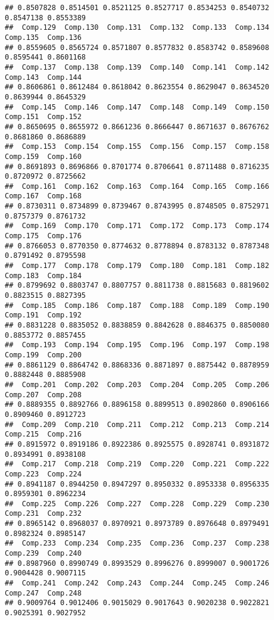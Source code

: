 \documentclass[
]{article}
\begin{document}
\begin{verbatim}
## 0.8507828 0.8514501 0.8521125 0.8527717 0.8534253 0.8540732 0.8547138 0.8553389 
##  Comp.129  Comp.130  Comp.131  Comp.132  Comp.133  Comp.134  Comp.135  Comp.136 
## 0.8559605 0.8565724 0.8571807 0.8577832 0.8583742 0.8589608 0.8595441 0.8601168 
##  Comp.137  Comp.138  Comp.139  Comp.140  Comp.141  Comp.142  Comp.143  Comp.144 
## 0.8606861 0.8612484 0.8618042 0.8623554 0.8629047 0.8634520 0.8639944 0.8645329 
##  Comp.145  Comp.146  Comp.147  Comp.148  Comp.149  Comp.150  Comp.151  Comp.152 
## 0.8650695 0.8655972 0.8661236 0.8666447 0.8671637 0.8676762 0.8681860 0.8686889 
##  Comp.153  Comp.154  Comp.155  Comp.156  Comp.157  Comp.158  Comp.159  Comp.160 
## 0.8691893 0.8696866 0.8701774 0.8706641 0.8711488 0.8716235 0.8720972 0.8725662 
##  Comp.161  Comp.162  Comp.163  Comp.164  Comp.165  Comp.166  Comp.167  Comp.168 
## 0.8730311 0.8734899 0.8739467 0.8743995 0.8748505 0.8752971 0.8757379 0.8761732 
##  Comp.169  Comp.170  Comp.171  Comp.172  Comp.173  Comp.174  Comp.175  Comp.176 
## 0.8766053 0.8770350 0.8774632 0.8778894 0.8783132 0.8787348 0.8791492 0.8795598 
##  Comp.177  Comp.178  Comp.179  Comp.180  Comp.181  Comp.182  Comp.183  Comp.184 
## 0.8799692 0.8803747 0.8807757 0.8811738 0.8815683 0.8819602 0.8823515 0.8827395 
##  Comp.185  Comp.186  Comp.187  Comp.188  Comp.189  Comp.190  Comp.191  Comp.192 
## 0.8831228 0.8835052 0.8838859 0.8842628 0.8846375 0.8850080 0.8853772 0.8857455 
##  Comp.193  Comp.194  Comp.195  Comp.196  Comp.197  Comp.198  Comp.199  Comp.200 
## 0.8861129 0.8864742 0.8868336 0.8871897 0.8875442 0.8878959 0.8882448 0.8885908 
##  Comp.201  Comp.202  Comp.203  Comp.204  Comp.205  Comp.206  Comp.207  Comp.208 
## 0.8889355 0.8892766 0.8896158 0.8899513 0.8902860 0.8906166 0.8909460 0.8912723 
##  Comp.209  Comp.210  Comp.211  Comp.212  Comp.213  Comp.214  Comp.215  Comp.216 
## 0.8915972 0.8919186 0.8922386 0.8925575 0.8928741 0.8931872 0.8934991 0.8938108 
##  Comp.217  Comp.218  Comp.219  Comp.220  Comp.221  Comp.222  Comp.223  Comp.224 
## 0.8941187 0.8944250 0.8947297 0.8950332 0.8953338 0.8956335 0.8959301 0.8962234 
##  Comp.225  Comp.226  Comp.227  Comp.228  Comp.229  Comp.230  Comp.231  Comp.232 
## 0.8965142 0.8968037 0.8970921 0.8973789 0.8976648 0.8979491 0.8982324 0.8985147 
##  Comp.233  Comp.234  Comp.235  Comp.236  Comp.237  Comp.238  Comp.239  Comp.240 
## 0.8987960 0.8990749 0.8993529 0.8996276 0.8999007 0.9001726 0.9004428 0.9007115 
##  Comp.241  Comp.242  Comp.243  Comp.244  Comp.245  Comp.246  Comp.247  Comp.248 
## 0.9009764 0.9012406 0.9015029 0.9017643 0.9020238 0.9022821 0.9025391 0.9027952 

\end{verbatim}
\end{document}

